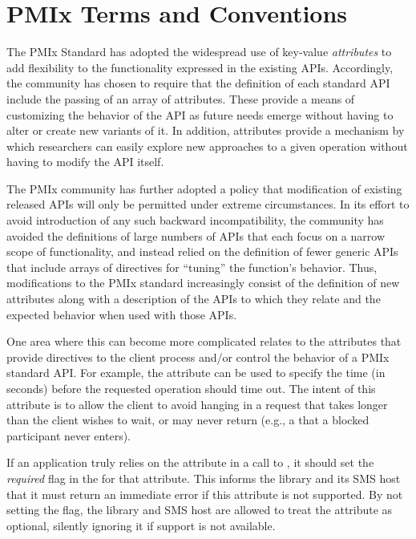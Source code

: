 \chapter{PMIx Terms and Conventions}
\label{chap:terms}

The \ac{PMIx} Standard has adopted the widespread use of key-value \textit{attributes} to add flexibility to the functionality expressed in the existing \acp{API}. Accordingly, the community has chosen to require that the definition of each standard \ac{API} include the passing of an array of attributes. These provide a means of customizing the behavior of the \ac{API} as future needs emerge without having to alter or create new variants of it. In addition, attributes provide a mechanism by which researchers can easily explore new approaches to a given operation without having to modify the \ac{API} itself.

The \ac{PMIx} community has further adopted a policy that modification of existing released \acp{API} will only be permitted under extreme circumstances. In its effort to avoid introduction of any such backward incompatibility, the community has avoided the definitions of large numbers of \acp{API} that each focus on a narrow scope of functionality, and instead relied on the definition of fewer generic \acp{API} that include arrays of directives for ``tuning'' the function's behavior. Thus, modifications to the PMIx standard increasingly consist of the definition of new attributes along with a description of the \acp{API} to which they relate and the expected behavior when used with those \acp{API}.

One area where this can become more complicated relates to the attributes that provide directives to the client process and/or control the behavior of a \ac{PMIx} standard \ac{API}. For example, the  attribute can be used to specify the time (in seconds) before the requested operation should time out.
The intent of this attribute is to allow the client to avoid hanging in a request that takes longer than the client wishes to wait, or may never return (e.g., a  that a blocked participant never enters).

If an application truly relies on the  attribute in a call to , it should set the \textit{required} flag in the  for that attribute. This informs the library and its \ac{SMS} host that it must return an immediate error if this attribute is not supported. By not setting the flag, the library and \ac{SMS} host are allowed to treat the attribute as optional, silently ignoring it if support is not available.

